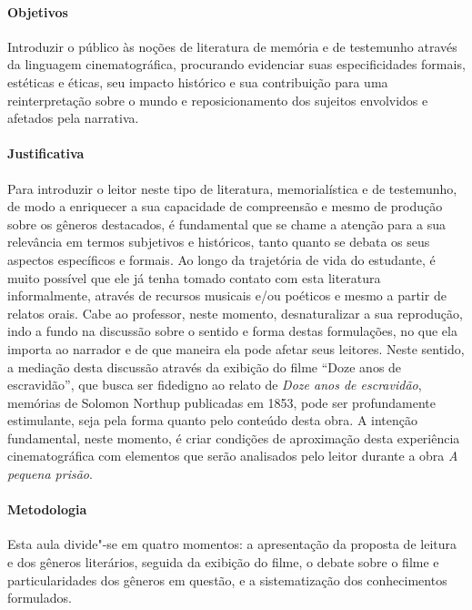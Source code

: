 \documentclass[11pt]{extarticle}
\begin{document}
\paragraph{Objetivos} Introduzir o público às noções de literatura de
memória e de testemunho através da linguagem cinematográfica, procurando
evidenciar suas especificidades formais, estéticas e éticas, seu impacto
histórico e sua contribuição para uma reinterpretação sobre o mundo e
reposicionamento dos sujeitos envolvidos e afetados pela narrativa.

\paragraph{Justificativa} Para introduzir o leitor neste tipo de
literatura, memorialística e de testemunho, de modo a enriquecer a sua
capacidade de compreensão e mesmo de produção sobre os gêneros
destacados, é fundamental que se chame a atenção para a sua relevância
em termos subjetivos e históricos, tanto quanto se debata os seus
aspectos específicos e formais. Ao longo da trajetória de vida do
estudante, é muito possível que ele já tenha tomado contato com esta
literatura informalmente, através de recursos musicais e/ou poéticos e
mesmo a partir de relatos orais. Cabe ao professor, neste momento,
desnaturalizar a sua reprodução, indo a fundo na discussão sobre o
sentido e forma destas formulações, no que ela importa ao narrador e de
que maneira ela pode afetar seus leitores. Neste sentido, a mediação
desta discussão através da exibição do filme ``Doze anos de escravidão'',
que busca ser fidedigno ao relato de \emph{Doze anos de escravidão},
memórias de Solomon Northup publicadas em 1853, pode ser profundamente
estimulante, seja pela forma quanto pelo conteúdo desta obra. A intenção
fundamental, neste momento, é criar condições de aproximação desta
experiência cinematográfica com elementos que serão analisados pelo
leitor durante a obra \emph{A pequena prisão}.

\paragraph{Metodologia} Esta aula divide"-se em quatro momentos: a
apresentação da proposta de leitura e dos gêneros literários, seguida da
exibição do filme, o debate sobre o filme e particularidades dos
gêneros em questão, e a sistematização dos conhecimentos formulados.
\end{document}
